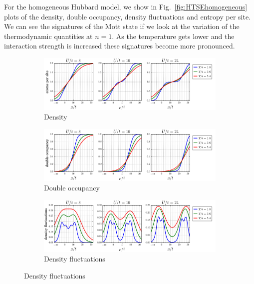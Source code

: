 \documentclass[11pt,letter]{article}
\begin{document}
For the homogeneous Hubbard model, we show in Fig.~\ref{fig:HTSEhomogeneous}
plots of the density,  double occupancy,  density fluctuations and entropy per
site.  We can see the signatures of the Mott state if we look at the variation
of the thermodynamic quantities at $n=1$.  As the temperature gets lower and the
interaction strength is increased these signatures become more pronounced. 
\begin{figure}
        \centering
        \begin{subfigure}[b]{0.75\textwidth}
                \includegraphics[width=\textwidth]{figures/HTSE_density_U.png}
                \caption{Density}
        \end{subfigure}%

        \begin{subfigure}[b]{0.75\textwidth}
                \includegraphics[width=\textwidth]{figures/HTSE_doublons_U.png}
                \caption{Double occupancy}
        \end{subfigure}
 
        \begin{subfigure}[b]{0.75\textwidth}
                \includegraphics[width=\textwidth]{figures/HTSE_densfluc_U.png}
                \caption{Density fluctuations}
        \end{subfigure}


\end{figure}
\end{document}
